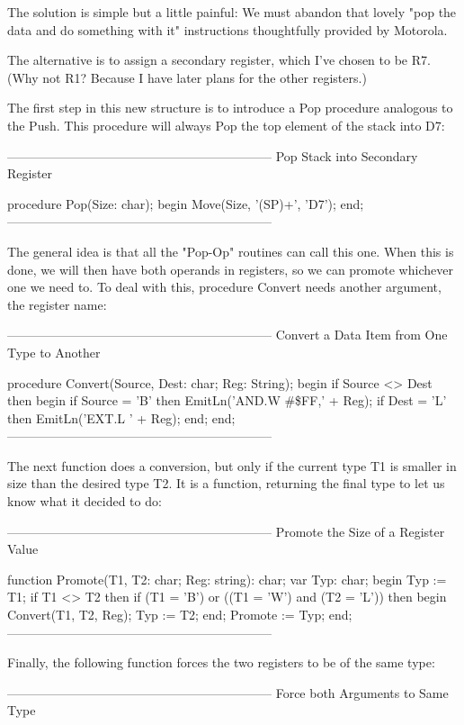 \documentclass[float=false, crop=false]{standalone}
\begin{document}
The solution is simple but a little painful: We must abandon that lovely "pop
the data and do something with it" instructions thoughtfully provided by
Motorola.

The alternative is to assign a secondary register, which I've chosen to be R7.
(Why not R1? Because I have later plans for the other registers.)

The first step in this new structure is to introduce a Pop procedure analogous
to the Push. This procedure will always Pop the top element of the stack into
D7:


{---------------------------------------------------------------}
{ Pop Stack into Secondary Register }

procedure Pop(Size: char);
begin
   Move(Size, '(SP)+', 'D7');
end;
{---------------------------------------------------------------}


The general idea is that all the "Pop-Op" routines can call this one. When this
is done, we will then have both operands in registers, so we can promote
whichever one we need to. To deal with this, procedure Convert needs another
argument, the register name:


{---------------------------------------------------------------}
{ Convert a Data Item from One Type to Another }

procedure Convert(Source, Dest: char; Reg: String);
begin
   if Source <> Dest then begin
      if Source  = 'B' then
         EmitLn('AND.W #\$FF,' + Reg);
      if Dest = 'L' then
         EmitLn('EXT.L ' + Reg);
   end;
end;
{---------------------------------------------------------------}


The next function does a conversion, but only if the current type T1 is smaller
in size than the desired type T2. It is a function, returning the final type to
let us know what it decided to do:


{---------------------------------------------------------------}
{ Promote the Size of a Register Value }

function Promote(T1, T2: char; Reg: string): char;
var Typ: char;
begin
   Typ := T1;
   if T1 <> T2 then
      if (T1 = 'B') or ((T1 = 'W') and (T2 = 'L')) then begin
         Convert(T1, T2, Reg);
         Typ := T2;
      end;
   Promote := Typ;
end;
{---------------------------------------------------------------}


Finally, the following function forces the two registers to be of the same type:


{---------------------------------------------------------------}
{ Force both Arguments to Same Type }
\end{document}
